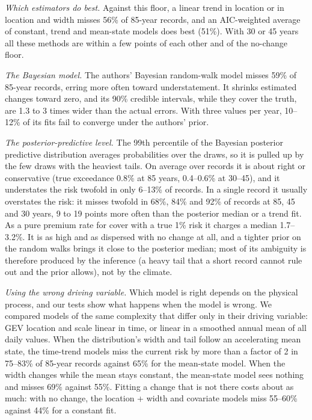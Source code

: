 \documentclass[11pt]{article}
\begin{document}
\emph{Which estimators do best.} Against this floor, a linear trend in location or in location and
width misses 56\% of 85-year records, and an AIC-weighted average of constant, trend and mean-state
models does best (51\%). With 30 or 45 years all these methods are within a few points of each other
and of the no-change floor.

\emph{The Bayesian model.} The authors' Bayesian random-walk model misses 59\% of 85-year records,
erring more often toward understatement. It shrinks estimated changes toward zero, and its 90\%
credible intervals, while they cover the truth, are 1.3 to 3 times wider than the actual errors.
With three values per year, 10--12\% of its fits fail to converge under the authors' prior.

\emph{The posterior-predictive level.} The 99th percentile of the Bayesian posterior predictive
distribution averages probabilities over the draws, so it is pulled up by the few draws with the
heaviest tails. On average over records it is about right or conservative (true exceedance 0.8\%
at 85 years, 0.4--0.6\% at 30--45), and it understates the risk twofold in only 6--13\% of records.
In a single record it usually overstates the risk: it misses twofold in 68\%, 84\% and 92\% of
records at 85, 45 and 30 years, 9 to 19 points more often than the posterior median or a trend fit.
As a pure premium rate for cover with a true 1\% risk it charges a median 1.7--3.2\%. It is as high
and as dispersed with no change at all, and a tighter prior on the random walks brings it close to
the posterior median; most of its ambiguity is therefore produced by the inference (a heavy tail
that a short record cannot rule out and the prior allows), not by the climate.

\emph{Using the wrong driving variable.} Which model is right depends on the physical process, and
our tests show what happens when the model is wrong. We compared models of the same complexity that
differ only in their driving variable: GEV location and scale linear in time, or linear in a
smoothed annual mean of all daily values. When the distribution's width and tail follow an
accelerating mean state, the time-trend models miss the current risk by more than a factor of 2 in
75--83\% of 85-year records against 65\% for the mean-state model. When the width changes while the
mean stays constant, the mean-state model sees nothing and misses 69\% against 55\%. Fitting a
change that is not there costs about as much: with no change, the location + width and covariate
models miss 55--60\% against 44\% for a constant fit.
\end{document}
